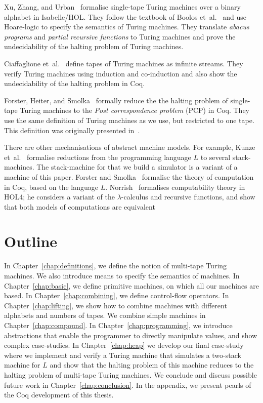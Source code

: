 Xu, Zhang, and Urban~\cite{xu2013} formalise single-tape Turing machines over a binary alphabet in Isabelle/HOL.  They follow the textbook of Boolos
et~al.~\cite{boolos2007computability} and use Hoare-logic to specify the semantics of Turing machines.  They translate \textit{abacus programs} and
\textit{partial recursive functions} to Turing machines and prove the undecidability of the halting problem of Turing machines.

Ciaffaglione et~al.~\cite{ciaffaglione2016} define tapes of Turing machines as infinite streams.  They verify Turing machines using induction and
co-induction and also show the undecidability of the halting problem in Coq.

Forster, Heiter, and Smolka~\cite{PCPITP} formally reduce the the halting problem of single-tape Turing machines to the \textit{Post correspondence
  problem} (PCP) in Coq.  They use the same definition of Turing machines as we use, but restricted to one tape.  This definition was originally
presented in~\cite{asperti2012}.

There are other mechanisations of abstract machine models.  For example, Kunze et~al.~\cite{KunzeEtAl:2018:Formal} formalise reductions from the
programming language $L$ to several stack-machines.  The stack-machine for that we build a simulator is a variant of a machine of this paper.  Forster
and Smolka~\cite{forster2017weak} formalise the theory of computation in Coq, based on the language $L$.  Norrish~\cite{NorrishComputabilityTheory}
formalises computability theory in HOL4; he considers a variant of the $\lambda$-calculus and recursive functions, and show that both models of
computations are equivalent



\section{Outline}
\label{sec:outline}

In Chapter~\ref{chap:definitions}, we define the notion of multi-tape Turing machines.  We also introduce means to specify the semantics of machines.
In Chapter~\ref{chap:basic}, we define primitive machines, on which all our machines are based.  In Chapter~\ref{chap:combining}, we define
control-flow operators.  In Chapter~\ref{chap:lifting}, we show how to combine machines with different alphabets and numbers of tapes.  We combine
simple machines in Chapter~\ref{chap:compound}.  In Chapter~\ref{chap:programming}, we introduce abstractions that enable the programmer to directly
manipulate values, and show complex case-studies.  In Chapter~\ref{chap:heap} we develop our final case-study where we implement and verify a Turing
machine that simulates a two-stack machine for $L$ and show that the halting problem of this machine reduces to the halting problem of multi-tape
Turing machines.  We conclude and discuss possible future work in Chapter~\ref{chap:conclusion}.  In the appendix, we present pearls of the Coq
development of this thesis.

